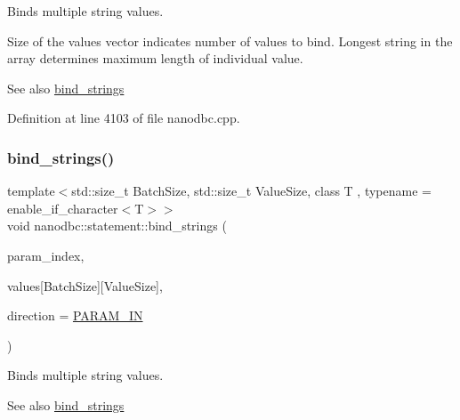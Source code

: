 Binds multiple string values. 

Size of the values vector indicates number of values to bind. Longest string in the array determines maximum length of individual value.

\begin{DoxySeeAlso}{See also}
\mbox{\hyperlink{group__bind__strings_ga8914c229f28ee7b02cf1b85684741326}{bind\+\_\+strings}} 
\end{DoxySeeAlso}


Definition at line 4103 of file nanodbc.\+cpp.

\mbox{\label{group__bind__strings_ga979e2bdbe4d7b3a6845112a306735a3e}} 
\subsubsection{\texorpdfstring{bind\_strings()}{bind\_strings()}\hspace{0.1cm}{\footnotesize\ttfamily [3/9]}}
{\footnotesize\ttfamily template$<$std\+::size\+\_\+t Batch\+Size, std\+::size\+\_\+t Value\+Size, class T , typename  = enable\+\_\+if\+\_\+character$<$\+T$>$$>$ \\
void nanodbc\+::statement\+::bind\+\_\+strings (\begin{DoxyParamCaption}\item[{short}]{param\+\_\+index,  }\item[{T const (\&)}]{values\mbox{[}\+Batch\+Size\mbox{]}\mbox{[}\+Value\+Size\mbox{]},  }\item[{\mbox{\hyperlink{classnanodbc_1_1statement_a523142f53cbbee8d68a074da993e7fa6}{param\+\_\+direction}}}]{direction = {\ttfamily \mbox{\hyperlink{classnanodbc_1_1statement_a523142f53cbbee8d68a074da993e7fa6ae33f42ce0677d00c291ff4d8e39f99de}{P\+A\+R\+A\+M\+\_\+\+IN}}} }\end{DoxyParamCaption})\hspace{0.3cm}{\ttfamily [inline]}}



Binds multiple string values. 

\begin{DoxySeeAlso}{See also}
\mbox{\hyperlink{group__bind__strings_ga8914c229f28ee7b02cf1b85684741326}{bind\+\_\+strings}} 
\end{DoxySeeAlso}


